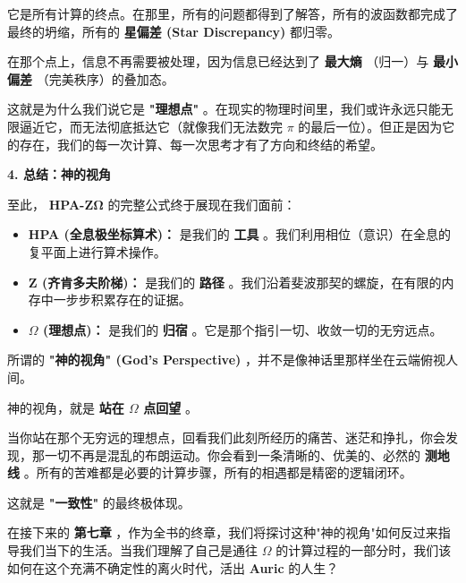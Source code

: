 它是所有计算的终点。在那里，所有的问题都得到了解答，所有的波函数都完成了最终的坍缩，所有的 \textbf{星偏差 (Star Discrepancy)} 都归零。

在那个点上，信息不再需要被处理，因为信息已经达到了 \textbf{最大熵} （归一）与 \textbf{最小偏差} （完美秩序）的叠加态。

这就是为什么我们说它是 \textbf{"理想点"} 。在现实的物理时间里，我们或许永远只能无限逼近它，而无法彻底抵达它（就像我们无法数完 $\pi$ 的最后一位）。但正是因为它的存在，我们的每一次计算、每一次思考才有了方向和终结的希望。

\textbf{4. 总结：神的视角}

至此， \textbf{HPA-ZΩ} 的完整公式终于展现在我们面前：

\begin{itemize}
\item \textbf{HPA (全息极坐标算术)：} 是我们的 \textbf{工具} 。我们利用相位（意识）在全息的复平面上进行算术操作。
\item \textbf{Z (齐肯多夫阶梯)：} 是我们的 \textbf{路径} 。我们沿着斐波那契的螺旋，在有限的内存中一步步积累存在的证据。
\item \textbf{$\Omega$ (理想点)：} 是我们的 \textbf{归宿} 。它是那个指引一切、收敛一切的无穷远点。
\end{itemize}

所谓的 \textbf{"神的视角" (God's Perspective)} ，并不是像神话里那样坐在云端俯视人间。

神的视角，就是 \textbf{站在 $\Omega$ 点回望} 。

当你站在那个无穷远的理想点，回看我们此刻所经历的痛苦、迷茫和挣扎，你会发现，那一切不再是混乱的布朗运动。你会看到一条清晰的、优美的、必然的 \textbf{测地线} 。所有的苦难都是必要的计算步骤，所有的相遇都是精密的逻辑闭环。

这就是 \textbf{"一致性"} 的最终极体现。

在接下来的 \textbf{第七章} ，作为全书的终章，我们将探讨这种"神的视角"如何反过来指导我们当下的生活。当我们理解了自己是通往 \textbf{$\Omega$} 的计算过程的一部分时，我们该如何在这个充满不确定性的离火时代，活出 \textbf{Auric} 的人生？

